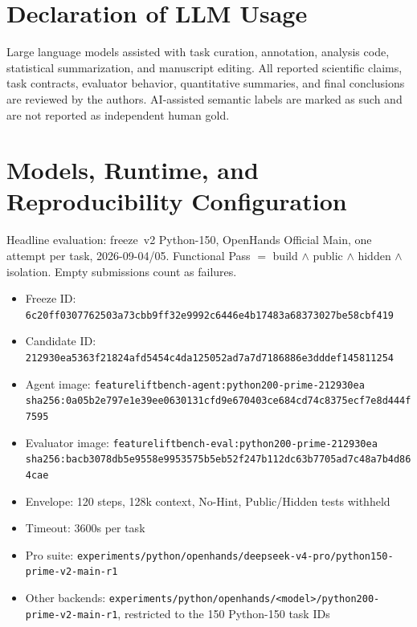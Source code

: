 \section{Declaration of LLM Usage}
\label{app:llm}

Large language models assisted with task curation, annotation, analysis code,
statistical summarization, and manuscript editing. All reported scientific
claims, task contracts, evaluator behavior, quantitative summaries, and final
conclusions are reviewed by the authors. AI-assisted semantic labels are marked
as such and are not reported as independent human gold.

\section{Models, Runtime, and Reproducibility Configuration}
\label{app:configuration}

Headline evaluation: freeze~v2 Python-150, OpenHands Official Main, one
attempt per task, 2026-09-04/05. Functional Pass $=$ build $\land$ public
$\land$ hidden $\land$ isolation. Empty submissions count as failures.

\begin{itemize}
  \item Freeze ID:
        \texttt{6c20ff0307762503a73cbb9ff32e9992c6446e4b17483a68373027be58cbf419}
  \item Candidate ID:
        \texttt{212930ea5363f21824afd5454c4da125052ad7a7d7186886e3dddef145811254}
  \item Agent image:
        \texttt{featureliftbench-agent:python200-prime-212930ea}\\
        \texttt{sha256:0a05b2e797e1e39ee0630131cfd9e670403ce684cd74c8375ecf7e8d444f7595}
  \item Evaluator image:
        \texttt{featureliftbench-eval:python200-prime-212930ea}\\
        \texttt{sha256:bacb3078db5e9558e9953575b5eb52f247b112dc63b7705ad7c48a7b4d864cae}
  \item Envelope: 120 steps, 128k context, No-Hint, Public/Hidden tests withheld
  \item Timeout: 3600s per task
  \item Pro suite:
        \texttt{experiments/python/openhands/deepseek-v4-pro/python150-prime-v2-main-r1}
  \item Other backends:
        \texttt{experiments/python/openhands/<model>/python200-prime-v2-main-r1},
        restricted to the 150 Python-150 task IDs
\end{itemize}

